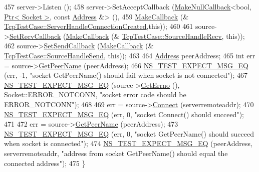 \begin{DoxyCode}
457   server->Listen ();
458   server->SetAcceptCallback (\hyperlink{group__makenullcallback_ga7e3cd6816f63ea9112c04b0086c2c65a}{MakeNullCallback}<\textcolor{keywordtype}{bool}, 
      \hyperlink{classns3_1_1Ptr}{Ptr< Socket >}, \textcolor{keyword}{const} \hyperlink{classns3_1_1Address}{Address} &> (),
459                              \hyperlink{group__makecallbackmemptr_ga9376283685aa99d204048d6a4b7610a4}{MakeCallback} (&
      \hyperlink{classTcpTestCase_a92ee004cc017259628ac1731ca4e040a}{TcpTestCase::ServerHandleConnectionCreated},\textcolor{keyword}{this}));
460 
461   source->\hyperlink{classns3_1_1Socket_a243f7835ef1a85f9270fd3577e3a40da}{SetRecvCallback} (\hyperlink{group__makecallbackmemptr_ga9376283685aa99d204048d6a4b7610a4}{MakeCallback} (&
      \hyperlink{classTcpTestCase_a924eda25940bdd641e431408eb750a24}{TcpTestCase::SourceHandleRecv}, \textcolor{keyword}{this}));
462   source->\hyperlink{classns3_1_1Socket_a85ff5c8cc7d242823f301b49264c68a4}{SetSendCallback} (\hyperlink{group__makecallbackmemptr_ga9376283685aa99d204048d6a4b7610a4}{MakeCallback} (&
      \hyperlink{classTcpTestCase_ae2b2672883a732447f02e4bf82840f34}{TcpTestCase::SourceHandleSend}, \textcolor{keyword}{this}));
463 
464   \hyperlink{classns3_1_1Address}{Address} peerAddress;
465   \textcolor{keywordtype}{int} err = source->\hyperlink{classns3_1_1Socket_a78a3c37a539d2e70869bb82cc60fbb09}{GetPeerName} (peerAddress);
466   \hyperlink{group__testing_ga7304ba46a28d8cf08dfdfd6499cf7068}{NS\_TEST\_EXPECT\_MSG\_EQ} (err, -1, \textcolor{stringliteral}{"socket GetPeerName() should fail when socket is not
       connected"});
467   \hyperlink{group__testing_ga7304ba46a28d8cf08dfdfd6499cf7068}{NS\_TEST\_EXPECT\_MSG\_EQ} (source->\hyperlink{classns3_1_1Socket_ae489616249d946f3c0dc831c05d0d711}{GetErrno} (), Socket::ERROR\_NOTCONN, \textcolor{stringliteral}{"socket
       error code should be ERROR\_NOTCONN"});
468 
469   err = source->\hyperlink{classns3_1_1Socket_a97f08aaf37b8fd7d4b5cad4dfdd4022a}{Connect} (serverremoteaddr);
470   \hyperlink{group__testing_ga7304ba46a28d8cf08dfdfd6499cf7068}{NS\_TEST\_EXPECT\_MSG\_EQ} (err, 0, \textcolor{stringliteral}{"socket Connect() should succeed"});
471 
472   err = source->\hyperlink{classns3_1_1Socket_a78a3c37a539d2e70869bb82cc60fbb09}{GetPeerName} (peerAddress);
473   \hyperlink{group__testing_ga7304ba46a28d8cf08dfdfd6499cf7068}{NS\_TEST\_EXPECT\_MSG\_EQ} (err, 0, \textcolor{stringliteral}{"socket GetPeerName() should succeed when socket is
       connected"});
474   \hyperlink{group__testing_ga7304ba46a28d8cf08dfdfd6499cf7068}{NS\_TEST\_EXPECT\_MSG\_EQ} (peerAddress, serverremoteaddr, \textcolor{stringliteral}{"address from socket
       GetPeerName() should equal the connected address"});
475 \}
\end{DoxyCode}


